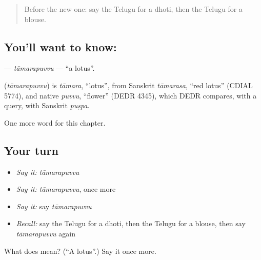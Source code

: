 \begin{quote}
Before the new one: say the Telugu for a dhoti, then the Telugu for a blouse.
\end{quote}

\subsection*{You'll want to know: }
\textbf{} — \emph{tāmarapuvvu} — \textquotedblleft{}a lotus\textquotedblright{}.

\begin{cousinweb}
\textbf{} (\emph{tāmarapuvvu}) is \emph{tāmara}, \textquotedblleft{}lotus\textquotedblright{}, from Sanskrit \emph{tāmarasa}, \textquotedblleft{}red lotus\textquotedblright{} (CDIAL 5774), and native \emph{puvvu}, \textquotedblleft{}flower\textquotedblright{} (DEDR 4345), which DEDR compares, with a query, with Sanskrit \emph{puṣpa}.
\end{cousinweb}

\begin{grammarlens}[title={What you've built}]
One more word for this chapter.
\end{grammarlens}

\subsection*{Your turn}
\begin{itemize}
\raggedright
  \item \emph{Say it:} \emph{tāmarapuvvu}
  \item \emph{Say it:} \emph{tāmarapuvvu}, once more
  \item \emph{Say it:} say \emph{tāmarapuvvu}
  \item \emph{Recall:} say the Telugu for a dhoti, then the Telugu for a blouse, then say \emph{tāmarapuvvu} again
\end{itemize}

\begin{tcolorbox}[breakable,colback=teal!4,colframe=teal!35!black,title={Before you move on}]
What does  mean? (\textquotedblleft{}A lotus\textquotedblright{}.) Say it once more.
\end{tcolorbox}
